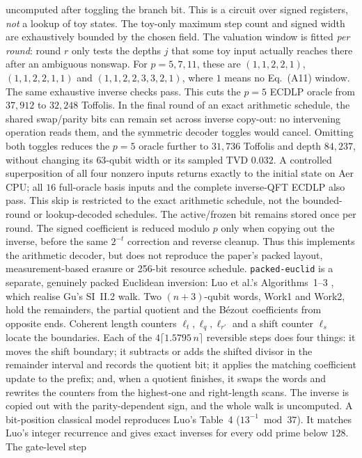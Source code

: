 \documentclass[11pt]{article}
\newcommand{\code}[1]{\texttt{#1}}
\theoremstyle{plain}
\theoremstyle{remark}
\begin{document}
uncomputed after toggling the branch bit. This is a circuit over signed
registers, \emph{not} a lookup of toy states. The toy-only maximum step count and
signed width are exhaustively bounded by the chosen field. The valuation
window is fitted \emph{per round}: round $r$ only tests the depths $j$ that
some toy input actually reaches there after an ambiguous nonswap. For
$p=5,7,11$, these are $(1,1,2,2,1)$, $(1,1,2,2,1,1)$ and
$(1,1,2,2,3,3,2,1)$, where $1$ means no Eq.~(A11) window. The same exhaustive
inverse checks pass. This cuts the $p=5$ ECDLP oracle from $37{,}912$ to
$32{,}248$ Toffolis. In the final round of an exact arithmetic schedule,
the shared swap/parity bits can remain set across inverse copy-out: no
intervening operation reads them, and the symmetric decoder toggles
would cancel. Omitting both toggles reduces the $p=5$ oracle further to
$31{,}736$ Toffolis and depth $84{,}237$, without changing its $63$-qubit
width or its sampled TVD $0.032$. A controlled superposition of all
four nonzero inputs returns exactly to the initial state on Aer CPU;
all $16$ full-oracle basis inputs and the complete inverse-QFT ECDLP
also pass. This skip is restricted to the exact arithmetic schedule,
not the bounded-round or lookup-decoded schedules. The active/frozen bit
remains stored once per round. The signed
coefficient is reduced modulo $p$ only when copying out the inverse, before
the same $2^{-t}$ correction and reverse cleanup. Thus this implements the
arithmetic decoder, but does not reproduce the paper's packed layout,
measurement-based erasure or 256-bit resource schedule.
\code{packed-euclid} is a separate, genuinely packed Euclidean inversion:
Luo et al.'s Algorithms~1--3 \cite{ec:luo26}, which realise Gu's SI~II.2 walk.
Two $(n+3)$-qubit words, Work1 and Work2, hold the remainders, the partial
quotient and the B\'ezout coefficients from opposite ends. Coherent length
counters $\ell_t,\ell_q,\ell_{r'}$ and a shift counter $\ell_s$ locate
the boundaries. Each of the $4\lceil1.5795\,n\rceil$ reversible steps does
four things: it moves the shift boundary; it subtracts or adds the shifted
divisor in the remainder interval and records the quotient bit; it applies
the matching coefficient update to the prefix; and, when a quotient finishes,
it swaps the words and rewrites the counters from the highest-one and
right-length scans. The inverse is copied out with the parity-dependent sign,
and the whole walk is uncomputed. A bit-position classical model reproduces
Luo's Table~4 ($13^{-1}\bmod37$). It matches Luo's integer recurrence and
gives exact inverses for every odd prime below $128$. The gate-level step
\end{document}
